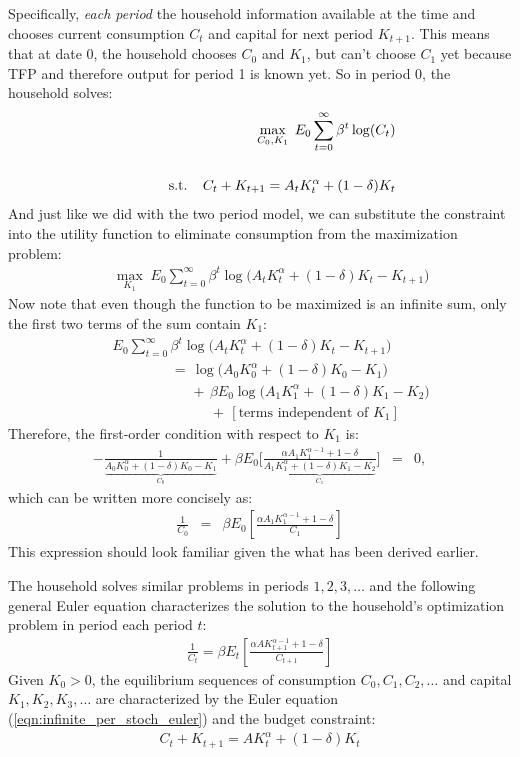 \documentclass[12pt,fleqn]{article}
\newcommand{\EE}{\begin{eqnarray}}
\newcommand{\FF}{\end{eqnarray}}
\newcommand{\tn}{\textnormal}
\begin{document}
Specifically, \emph{each period} the household information available at the time and chooses current consumption $C_t$ and capital for next period $K_{t+1}$. This means that at date 0, the household chooses $C_0$ and $K_1$, but can't choose $C_1$ yet because TFP and therefore output for period 1 is known yet. So in period 0, the household solves:
	\EE
	&&\max_{C_0,K_1} \; E_0\sum_{t=0}^{\infty}\beta^t\log (C_t) \\\nonumber\\
	&& \; \; \; \;  \; \; \; \; \tn{s.t.} \; \; \; \; C_t + K_{t+1} = A_t K_{t}^{\alpha}  + (1-\delta)K_t\nonumber
	\FF 
And just like we did with the two period model, we can substitute the constraint into the utility function to eliminate consumption from the maximization problem:
	\EE
	&&\max_{K_1} \; E_0\sum_{t=0}^{\infty}\beta^t\log \Big(A_t K_{t}^{\alpha}  + (1-\delta)K_t - K_{t+1}\Big) 
	\FF
Now note that even though the function to be maximized is an infinite sum, only the first two terms of the sum contain $K_1$:
	\EE
	&& E_0\sum_{t=0}^{\infty}\beta^t\log \Big(A_t K_{t}^{\alpha}  + (1-\delta)K_t - K_{t+1}\Big)   \\
	&& \; \; \; \; \; \; \; \; \; \; \; \; \; \; \; = \,  \log\Big(A_0 K_0^{\alpha} + (1-\delta)K_0 - K_1\Big) \nonumber \\
	&& \; \; \; \; \; \; \; \; \; \; \; \; \; \; \; \; \; \; \; \; + \, \beta E_0 \log\Big(A_1 K_1^{\alpha} + (1-\delta)K_1 - K_2\Big)\nonumber \\
	&  & \; \; \; \; \; \; \; \; \; \; \; \; \; \; \; \; \; \; \; \; \; \; \; \; \; + \, \left[\text{terms independent of $K_1$}\right]
	\FF
Therefore, the first-order condition with respect to $K_1$ is:
	\EE
    -\frac{1}{\underbrace{A_0 K_{0}^{\alpha}  + (1-\delta)K_0 - K_{1}}_{C_0}} + \beta E_0 \bigg[\frac{\alpha A_1 K_1^{\alpha - 1} + 1 - \delta}{\underbrace{A_{1} K_{1}^{\alpha}  + (1-\delta)K_{1} - K_{2}}_{C_1}}\bigg] & = & 0,
    \FF
which can be written more concisely as:
	\EE
	\frac{1}{C_0} & = & \beta E_0 \left[\frac{\alpha A_{1}K_1^{\alpha - 1} + 1 - \delta}{C_1}\right]
	\FF
This expression should look familiar given the what has been derived earlier.

The household solves similar problems in periods $1, 2, 3, \ldots$ and the following general Euler equation characterizes the solution to the household's optimization problem in period each period $t$:
	\EE
	\boxed{\frac{1}{C_t} = \beta E_t \left[\frac{\alpha A K_{t+1}^{\alpha - 1} + 1 - \delta}{C_{t+1}}\right]} \label{eqn:infinite_per_stoch_euler}
	\FF
Given $K_0>0$, the equilibrium sequences of consumption $C_0, C_1, C_2, \ldots$ and capital $K_1, K_2, K_3, \ldots$ are characterized by the Euler equation (\ref{eqn:infinite_per_stoch_euler}) and the budget constraint:
\EE
\boxed{C_t + K_{t+1} = A K_{t}^{\alpha}  + (1-\delta)K_t} \label{eqn:infinite_per_stoch_bc}
\FF
\end{document}
